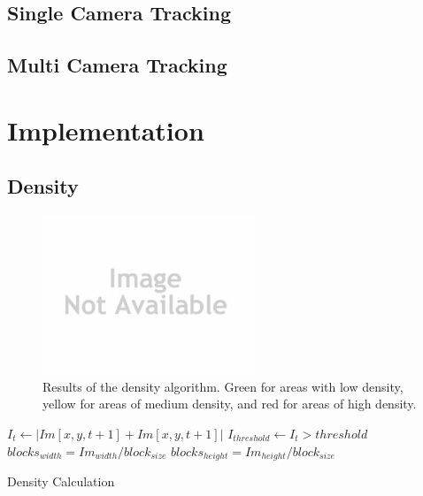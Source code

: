 \documentclass[conference]{IEEEtran}
\begin{document}
\subsection{Single Camera Tracking}

\subsection{Multi Camera Tracking}

\section{Implementation}

\subsection{Density}

\begin{figure}[!t]
\centering
\includegraphics[width=2.5in]{noImage.jpg}
\caption{Results of the density algorithm. Green for areas with low density, yellow for areas of medium density, and red for areas of high density.}
\label{Density}
\end{figure}

\begin{algorithm}
\DontPrintSemicolon
 $I_{t} \leftarrow | Im[x, y, t+1] + Im[x, y, t+1] | $\;
 $I_{threshold} \leftarrow I_{t} > threshold$\;
 $blocks_{width} = Im_{width}/block_{size}$\;
 $blocks_{height} = Im_{height}/block_{size}$\;
\caption{Density Calculation}
\end{algorithm}
\end{document}
